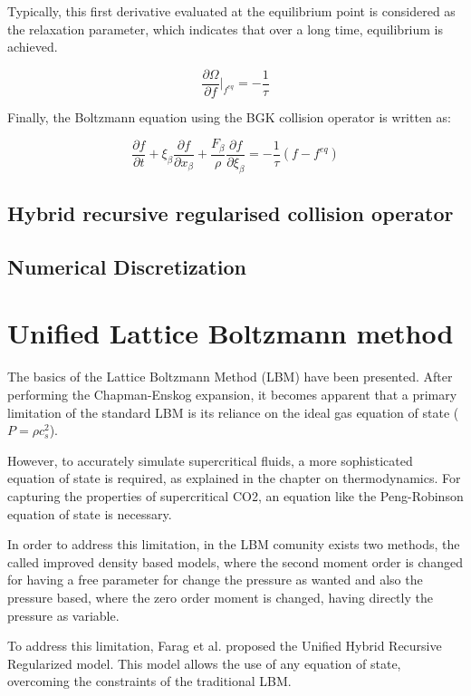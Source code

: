 Typically, this first derivative evaluated at the equilibrium point is 
considered as the relaxation parameter, which indicates that over a 
long time, equilibrium is achieved.

\begin{equation}
	\frac{\partial \Omega}{\partial f} \bigg|_{f^{eq}} = -\frac{1}{\tau}	
\end{equation}

Finally, the Boltzmann equation using the BGK collision operator is written as:

\begin{equation}
	\frac{\partial f}{\partial t} 
	+ \xi_{\beta} \frac{\partial f}{\partial x_{\beta}}
	+ \frac{F_{\beta}}{\rho} \frac{\partial f}{\partial \xi_{\beta}} = -\frac{1}{\tau}(f - f^{eq})
\end{equation}


\subsection{Hybrid recursive regularised collision operator}


\subsection{Numerical Discretization}

\section{Unified Lattice Boltzmann method}
The basics of the Lattice Boltzmann Method (LBM) have been presented. After performing the Chapman-Enskog expansion, it becomes apparent that a primary limitation of the standard LBM is its reliance on the ideal gas equation of state ($P$$=$$\rho$$c_s^2$).

However, to accurately simulate supercritical fluids, a more sophisticated equation of state is required, as explained in the chapter on thermodynamics. For capturing the properties of supercritical CO2, an equation like the Peng-Robinson equation of state is necessary.

In order to address this limitation, in the LBM comunity exists two methods, the called
improved density based models, where the second moment order is changed for having a free parameter for change the pressure as wanted and also the pressure based, where the zero order moment is changed, having directly the pressure as variable.  

To address this limitation, Farag et al. proposed the Unified Hybrid Recursive Regularized model. This model allows the use of any equation of state, overcoming the constraints of the traditional LBM.

